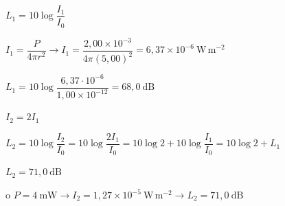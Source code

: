 \begin{solapartat}
 $L_1 = 10\log\dfrac{I_1}{I_0}$

 $I_1 = \dfrac{P}{4\pi r^2} \rightarrow I_1 = \dfrac{2,00\times 10^{-3}}{4\pi(5,00)^2} = 6,37\times 10^{-6}\ \mathrm{W\,m^{-2}}$

 $L_1 = 10\log\dfrac{6,37\cdot 10^{-6}}{1,00\times 10^{-12}} = 68,0\ \mathrm{dB}$
\end{solapartat}

\begin{solapartat}
$I_2 = 2I_1$

 $L_2 = 10\log\dfrac{I_2}{I_0} = 10\log\dfrac{2I_1}{I_0} = 10\log 2 + 10\log\dfrac{I_1}{I_0} = 10\log 2 + L_1$

 $L_2 = 71,0\ \mathrm{dB}$

o \quad $P = 4\ \mathrm{mW} \rightarrow I_2 = 1,27\times 10^{-5}\ \mathrm{W\,m^{-2}} \rightarrow L_2 = 71,0\ \mathrm{dB}$
\end{solapartat}
